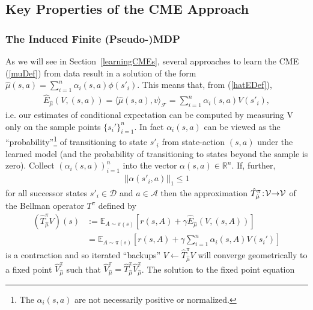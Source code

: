 \documentclass[letterpaper]{article}
\newcommand{\cD}{{\mathcal D}}
\newcommand{\cF}{{\mathcal F}}
\newcommand{\cA}{{\mathcal A}}
\newcommand{\cV}{{\mathcal V}}
\newcommand{\E}{{\mathbb E}}
\newcommand{\R}{{\mathbb R}}
\newcommand{\lang}{\langle}
\newcommand{\rang}{\rangle}
\newcommand{\nn}{\nonumber}
\begin{document}

\subsection{Key Properties of the CME Approach}

\subsubsection{The Induced Finite (Pseudo-)MDP} \label{InducedMDP}

As we will see in Section~\ref{learningCMEs}, several approaches to learn the CME (\ref{muDef}) from data result in a solution of the form $\hat \mu(s,a) = \sum_{i=1}^n \alpha_i(s,a) \phi(s'_i)$. This means that, from (\ref{hatEDef}),
\begin{align}
\hat E_{\hat\mu}(V,(s,a)) = \lang \hat \mu(s,a) , v \rang_\cF =\sum_{i=1}^n \alpha_i(s,a) V(s'_i), \label{finiteExpansion}
\end{align}
i.e. our estimates of conditional expectation can be computed by measuring V only on the sample points $\{ s_i'\}_{i=1}^n$. In fact $\alpha_i(s,a)$ can be viewed as the ``probability''\footnote{The $\alpha_i(s,a)$ are not necessarily positive or normalized.} of transitioning to state $s'_i$ from state-action $(s,a)$ under the learned model (and the probability of transitioning to states beyond the sample is zero). Collect $(\alpha_i(s,a))_{i=1}^n$ into the vector $\alpha(s,a)\in \R^n$.
If, further,
\begin{align}
||\alpha(s'_i,a)||_1 \le 1 \label{L1Constraint}
\end{align}
for all successor states $s'_i\in\cD$ and $a\in\cA$ then the approximation  $\hat T^\pi_{\hat \mu}\hspace{-0.6mm}:\hspace{-0.6mm}\cV\hspace{-0.9mm}\to\hspace{-0.9mm}\cV$ of the Bellman operator $T^\pi$ defined by
\begin{align}
(\hat T^\pi_{\hat \mu}V)(s)&:=  \E_{A\sim\pi(s)} [ r(s,A) + \gamma \hat E_{\hat \mu}(V, (s,A))] \nn\\
&= \E_{A\sim\pi(s)} [ r(s,A) + \gamma \sum_{i=1}^n \alpha_i(s,A)V(s_i') ] \label{approxBellman}
\end{align}
is a contraction and so iterated ``backups'' $V\leftarrow \hat T^\pi_{\hat \mu}V$ will converge geometrically to a fixed point $\hat V_{\hat \mu}^{\pi}$ such that $\hat V_{\hat \mu}^{\pi} = \hat T^\pi_{\hat \mu} \hat V_{\hat \mu}^{\pi}$. The solution to the fixed point equation
\end{document}
